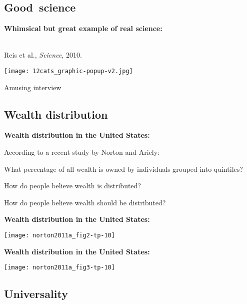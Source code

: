 



\subsection{Good\ science}

  \textbf{Whimsical but great example of real science:}

  \\
  Reis et al., \textit{Science}, 2010.

  \medskip

  \texttt{[image: 12cats\_graphic-popup-v2.jpg]}

  Amusing interview 



\subsection{Wealth distribution}

  \textbf{Wealth distribution in the United States:}

  According to a recent study by Norton and Ariely:~\cite{norton2011a}
  
  
    What percentage of all wealth is owned by 
    individuals grouped into quintiles?
  
    How do people believe wealth is distributed?
  
    How do people believe wealth should be distributed?
  
  


  \textbf{Wealth distribution in the United States:}

  \texttt{[image: norton2011a\_fig2-tp-10]}
  


  \textbf{Wealth distribution in the United States:}

  \texttt{[image: norton2011a\_fig3-tp-10]}
  

\subsection{Universality}

